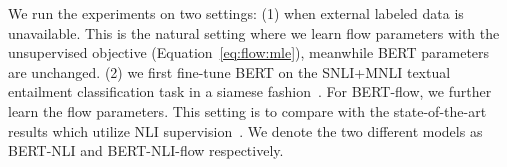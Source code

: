 \documentclass[11pt,a4paper]{article}
\begin{document}
We run the experiments on two settings: (1) when external labeled data is unavailable. This is the natural setting where we learn flow parameters with the unsupervised objective (Equation~\ref{eq:flow:mle}), meanwhile BERT parameters are unchanged. (2) we first fine-tune BERT on the SNLI+MNLI textual entailment classification task in a siamese fashion~\citep{reimers2019sentence}. For BERT-flow, we further learn the flow parameters. This setting is to compare with the state-of-the-art results which utilize NLI supervision~\citep{reimers2019sentence}. We denote the two different models as BERT-NLI and BERT-NLI-flow respectively.

\begin{table*}[ht]
\begin{center}
\end{center}
\end{table*}
\end{document}

